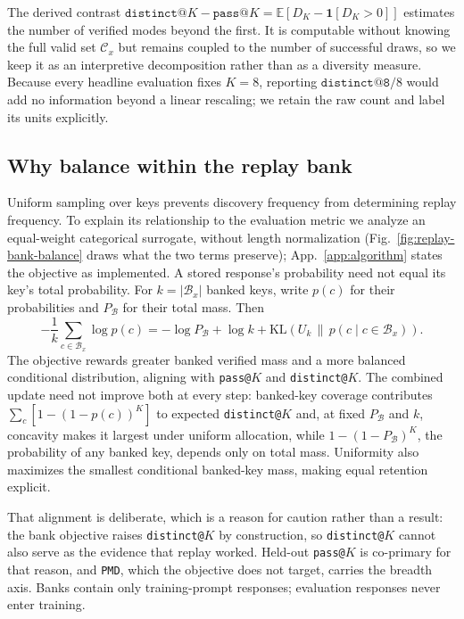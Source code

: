 \documentclass{article}
\newcommand{\1}{\mathbf 1}
\newcommand{\E}{\mathbb E}
\newcommand{\pmd}{\texttt{PMD}}
\theoremstyle{remark}
\theoremstyle{definition}
\theoremstyle{plain}
\begin{document}
The derived contrast $\texttt{distinct@}K-\texttt{pass@}K=\E[D_K-\1[D_K>0]]$
estimates the number of verified modes beyond the first. It is computable
without knowing the full valid set $\mathcal C_x$ but remains coupled to the
number of successful draws, so we keep it as an interpretive decomposition
rather than as a diversity measure. Because every
headline evaluation fixes $K=8$, reporting $\texttt{distinct@8}/8$ would add no
information beyond a linear rescaling; we retain the raw count and label its
units explicitly.



\subsection{Why balance within the replay bank}
\label{app:replay-metric-alignment}

Uniform sampling over keys prevents discovery frequency from determining replay
frequency. To explain its relationship to the evaluation metric we analyze an
equal-weight categorical surrogate, without length normalization
(Fig.~\ref{fig:replay-bank-balance} draws what the two terms preserve);
App.~\ref{app:algorithm} states the objective as implemented.
A stored response's probability need not equal its key's total probability.
For $k=|\mathcal B_x|$ banked keys, write $p(c)$ for their probabilities and
$P_{\mathcal B}$ for their total mass. Then
\begin{equation}
 -\frac1k\sum_{c\in\mathcal B_x}\log p(c)
 =-\log P_{\mathcal B}+\log k+
   \mathrm{KL}\!\left(U_k\,\|\,
   p(c\mid c\in\mathcal B_x)\right).
 \label{eq:replay-bank-decomposition}
\end{equation}
The objective rewards greater banked verified mass and a more balanced
conditional distribution, aligning with \texttt{pass@}$K$ and
\texttt{distinct@}$K$. The combined update need not improve both at every step:
banked-key coverage contributes $\sum_c[1-(1-p(c))^K]$ to expected
\texttt{distinct@}$K$ and, at fixed $P_{\mathcal B}$ and $k$, concavity makes it
largest under uniform allocation, while $1-(1-P_{\mathcal B})^K$, the
probability of any banked key, depends only on total mass. Uniformity also
maximizes the smallest conditional banked-key mass, making equal retention
explicit.

That alignment is deliberate, which is a reason for caution rather than a
result: the bank objective raises \texttt{distinct@}$K$ by construction, so
\texttt{distinct@}$K$ cannot also serve as the evidence that replay worked.
Held-out \texttt{pass@}$K$ is co-primary for that reason, and \pmd{}, which the
objective does not target, carries the breadth axis. Banks contain only
training-prompt responses; evaluation responses never enter training.
\end{document}
